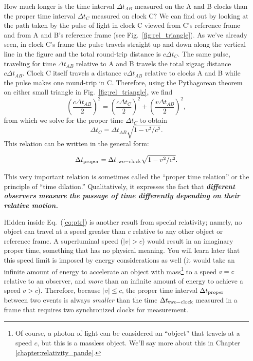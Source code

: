 How much longer is the time interval $\Delta t_{AB}$ measured on the A
and B clocks than the proper time interval $\Delta t_C$ measured on
clock C?  We can find out by looking at the path taken by the pulse of
light in clock C viewed from C's reference frame and from A and B's
reference frame (see Fig.~\ref{fig:rel_triangle}).  As we've already
seen, in clock C's frame the pulse travels straight up and down along
the vertical line in the figure and the total round-trip distance is
$c\Delta t_C$.  The same pulse, traveling for time $\Delta t_{AB}$
relative to A and B travels the total zigzag distance $c\Delta
t_{AB}$.  Clock C itself travels a distance $v\Delta t_{AB}$ relative
to clocks A and B while the pulse makes one round-trip in C.
Therefore, using the Pythagorean theorem on either small triangle in
Fig.~\ref{fig:rel_triangle}, we find
\begin{equation}
\left(\frac{c\Delta t_{AB}}{2}\right)^2 = 
\left(\frac{c\Delta t_{C}}{2}\right)^2 + 
\left(\frac{v\Delta t_{AB}}{2}\right)^2,
\end{equation}
from which we solve for the proper time $\Delta t_C$ to obtain
\begin{equation}
\Delta t_C = \Delta t_{AB}\sqrt{1 - v^2/c^2}.
\end{equation}
This relation can be written in the general form:

\begin{boxiteq}
{
\begin{equation}
\Delta t_{\rm proper} = \Delta t_{\rm two-clock}\sqrt{1 - v^2/c^2}.
\label{eq:ptr}
\end{equation}
}
\end{boxiteq}

\noindent This very important relation is sometimes called the
``proper time relation'' or the principle of ``time dilation.''
Qualitatively, it expresses the fact that {\bf {\em different
observers measure the passage of time differently depending on their 
relative motion.}}
   
Hidden inside Eq.~(\ref{eq:ptr}) is another result from special
relativity; namely, no object can travel at a speed greater than $c$
relative to any other object or reference frame.  A superluminal speed
($|v| > c$) would result in an imaginary proper time, something that
has no physical meaning.  You will learn later that this speed limit
is imposed by energy considerations as well (it would take an infinite
amount of energy to accelerate an object with mass\footnote{Of course,
a photon of light can be considered an ``object'' that travels at 
a speed $c$, but this is a massless object.  We'll say more about this 
in Chapter \ref{chapter:relativity_pande}.} to a speed $v = c$
relative to an observer, and {\em more} than an infinite amount of
energy to achieve a speed $v > c$).  Therefore, because $|v| \leq c$,
the proper time interval $\Delta t_{\rm proper}$ between two events
is always {\em smaller} than the time $\Delta t_{\rm two-clock}$
measured in a frame that requires two synchronized clocks for
measurement.

